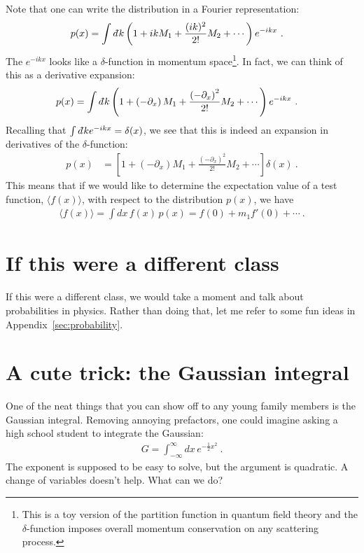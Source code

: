 \begin{example}
Note that one can write the distribution in a Fourier representation:
\begin{align}
	p(x) &= \int \dbar k 
	\left( 1+ikM_1 + \frac{(ik)^2}{2!}M_2 + \cdots \right)e^{-ikx} \ .
\end{align}
The $e^{-ikx}$ looks like a $\delta$-function in momentum space\footnote{This is a toy version of the partition function in quantum field theory and the $\delta$-function imposes overall momentum conservation on any scattering process.}. In fact, we can think of this as a derivative expansion:
\begin{align}
	p(x) &= \int \dbar k \left( 1+ \left(-\partial_x\right) M_1 + \frac{\left(-\partial_x\right)^2}{2!}M_2 + \cdots \right)e^{-ikx} \ .
\end{align}
Recalling that $\int \dbar k e^{-ikx} = \delta(x)$, we see that this is indeed an expansion in derivatives of the $\delta$-function:
\begin{align}
	p(x) &= \left[ 1+ \left(-\partial_x\right) M_1 + \frac{\left(-\partial_x\right)^2}{2!}M_2 + \cdots \right] \delta(x) \ .
\end{align}
This means that if we would like to determine the expectation value of a test function, $\langle f(x)\rangle$, with respect to the distribution $p(x)$, we have
\begin{align}
	\langle f(x)\rangle = \int dx\, f(x)\, p(x) = f(0) + m_1 f'(0) + \cdots \ .
\end{align}
\end{example}



\section{If this were a different class}

If this were a different class, we would take a moment and talk about probabilities in physics. Rather than doing that, let me refer to some fun ideas in Appendix~\ref{sec:probability}.

\section{A cute trick: the Gaussian integral}

One of the neat things that you can show off to any young family members is the Gaussian integral. Removing annoying prefactors, one could imagine asking a high school student to integrate the Gaussian:
\begin{align}
	G = \int_{-\infty}^\infty dx\, e^{-\frac{1}{2}x^2} \ .
\end{align}
The exponent is supposed to be easy to solve, but the argument is quadratic. A change of variables doesn't help. What can we do?

